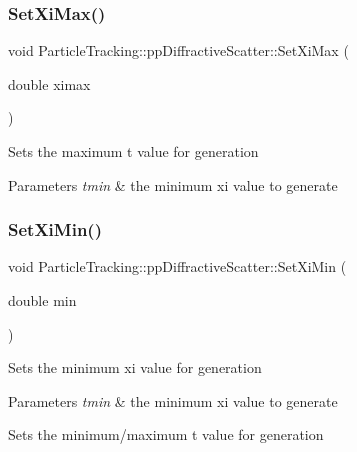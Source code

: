 \subsubsection{\texorpdfstring{Set\+Xi\+Max()}{SetXiMax()}}
{\footnotesize\ttfamily void Particle\+Tracking\+::pp\+Diffractive\+Scatter\+::\+Set\+Xi\+Max (\begin{DoxyParamCaption}\item[{double}]{ximax }\end{DoxyParamCaption})}

Sets the maximum t value for generation 
\begin{DoxyParams}{Parameters}
{\em tmin} & the minimum xi value to generate \\
\hline
\end{DoxyParams}
\mbox{\label{classParticleTracking_1_1ppDiffractiveScatter_a8138fee1bfa1b108e2862a1f56024fa8}} 
\subsubsection{\texorpdfstring{Set\+Xi\+Min()}{SetXiMin()}}
{\footnotesize\ttfamily void Particle\+Tracking\+::pp\+Diffractive\+Scatter\+::\+Set\+Xi\+Min (\begin{DoxyParamCaption}\item[{double}]{min }\end{DoxyParamCaption})}

Sets the minimum xi value for generation 
\begin{DoxyParams}{Parameters}
{\em tmin} & the minimum xi value to generate\\
\hline
\end{DoxyParams}
Sets the minimum/maximum t value for generation \mbox{\label{classParticleTracking_1_1ppDiffractiveScatter_af1e7bef526bd62823d1cdc5e9346ac1f}} 
